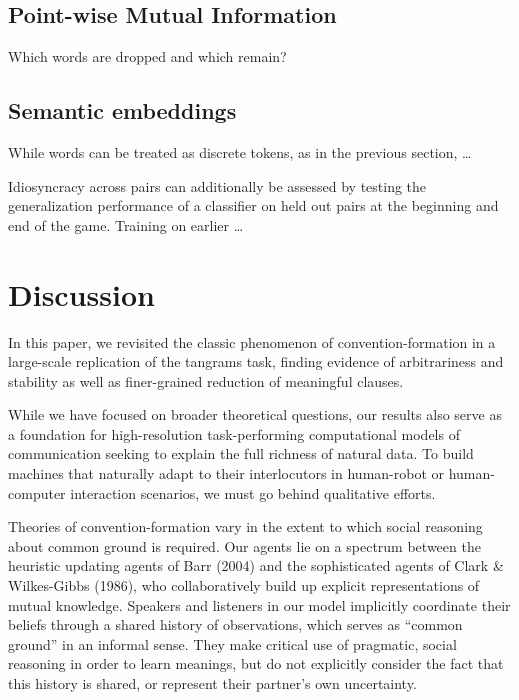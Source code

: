 \subsection{Point-wise Mutual Information}

Which words are dropped and which remain?

\subsection{Semantic embeddings}\label{arbitrariness-and-stability}

While words can be treated as discrete tokens, as in the previous section, \dots

Idiosyncracy across pairs can additionally be assessed by testing the generalization performance of a classifier on held out pairs at the beginning and end of the game. Training on earlier \dots

\section{Discussion}\label{general-discussion}

In this paper, we revisited the classic phenomenon of
convention-formation in a large-scale replication of the tangrams task,
finding evidence of arbitrariness and stability as well as finer-grained
reduction of meaningful clauses. 

While we have focused on broader theoretical questions, our results also serve as a foundation for high-resolution task-performing computational models of communication seeking to explain the full richness of natural data. To build machines that naturally adapt to their interlocutors in human-robot or human-computer interaction scenarios, we must go behind qualitative efforts.

Theories of convention-formation vary in the extent to which social
reasoning about common ground is required. Our agents lie on a spectrum
between the heuristic updating agents of Barr (2004) and the
sophisticated agents of Clark \& Wilkes-Gibbs (1986), who
collaboratively build up explicit representations of mutual knowledge.
Speakers and listeners in our model implicitly coordinate their beliefs
through a shared history of observations, which serves as ``common
ground'' in an informal sense. They make critical use of pragmatic,
social reasoning in order to learn meanings, but do not explicitly
consider the fact that this history is shared, or represent their
partner's own uncertainty.

